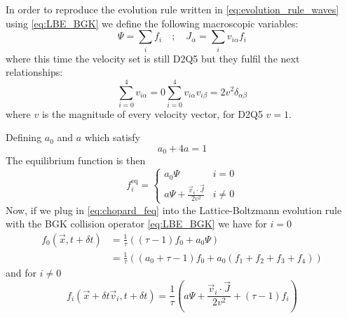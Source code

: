 In order to reproduce the evolution rule written in \ref{eq:evolution_rule_waves} using \ref{eq:LBE_BGK} we define the following macroscopic variables:
\begin{equation}\label{eq:chopard_fields}
    \Psi = \sum_i f_i \quad;\quad J_{\alpha} = \sum_i v_{i\alpha}f_i
\end{equation}
where this time the velocity set is still D2Q5 but they fulfil the next relationships:
\begin{subequations}
\begin{equation}
    \sum_{i=0}^4 v_{i\alpha} = 0
\end{equation}
\begin{equation}
    \sum_{i=0}^4 v_{i\alpha}v_{i\beta} = 2v^2\delta_{\alpha\beta}
\end{equation}
\end{subequations}
where $v$ is the magnitude of every velocity vector, for D2Q5 $v=1$.

Defining $a_0$ and $a$ which satisfy
\begin{equation}
    a_0 + 4a = 1
\end{equation} 
The equilibrium function is then
\begin{equation}\label{eq:chopard_feq}
    f_i^{\text{eq}} = \begin{cases}
        a_0\Psi & i=0\\
        a\Psi + \frac{\vec v_i \cdot \vec J}{2v^2} & i\neq0 
    \end{cases}
\end{equation}
Now, if we plug in \ref{eq:chopard_feq} into the Lattice-Boltzmann evolution rule with the BGK collision operator \ref{eq:LBE_BGK} we have for $i=0$
\begin{align}
    f_0(\vec x, t + \delta t) &= \frac{1}{\tau}\left( (\tau - 1)f_0 + a_0\Psi \right) \nonumber\\
    &= \frac{1}{\tau}\left((a_0+\tau-1)f_0 + a_0(f_1+f_2+f_3+f_4)\right)
\end{align}
and for $i\neq0$
\begin{equation}\label{eq:chopard_waves_evolution_rule_f0}
    f_i(\vec x+\delta t\vec v_i, t + \delta t) = \frac{1}{\tau}\left( a\Psi + \frac{\vec v_i \cdot \vec J}{2v^2} + (\tau-1)f_i \right)
\end{equation}


